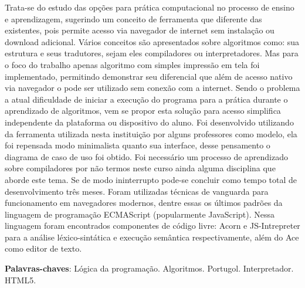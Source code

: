 

\begin{resumo}
Trata-se do estudo das opções para prática computacional no processo de ensino e aprendizagem, sugerindo um conceito de ferramenta que diferente das existentes, pois permite acesso via navegador de internet sem instalação ou download adicional. Vários conceitos são apresentados sobre algoritmos como: sua estrutura e seus tradutores, sejam eles compiladores ou interpretadores. Mas para o foco do trabalho apenas algoritmo com simples impressão em tela foi implementado, permitindo demonstrar seu diferencial que além de acesso nativo via navegador o pode ser utilizado sem conexão com a internet. Sendo o problema a atual dificuldade de iniciar a execução do programa para a prática durante o aprendizado de algoritmos, vem se propor esta solução para acesso simplifica independente da plataforma ou dispositivo do aluno. Foi desenvolvido utilizando da ferramenta utilizada nesta instituição por alguns professores como modelo, ela foi repensada modo minimalista quanto sua interface, desse pensamento o diagrama de caso de uso foi obtido. Foi necessário um processo de aprendizado sobre compiladores por não termos neste curso ainda alguma disciplina que aborde este tema. Se de modo ininterrupto pode-se concluir como tempo total de desenvolvimento três meses. Foram utilizadas técnicas de vanguarda para funcionamento em navegadores modernos, dentre essas os últimos padrões da linguagem de programação ECMAScript (popularmente JavaScript). Nessa linguagem foram encontrados componentes de código livre: Acorn e JS-Intrepreter para a análise léxico-sintática e execução semântica respectivamente, além do Ace como editor de texto.

\vspace{\onelineskip}
\textbf{Palavras-chaves}: Lógica da programação. Algoritmos. Portugol. Interpretador. HTML5.
\end{resumo}

%
